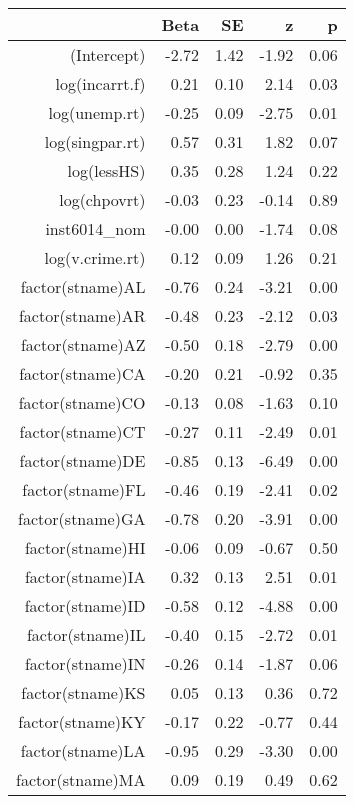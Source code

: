 \begin{table}[ht]
\centering
\begin{tabular}{rrrrr}
  \hline
 & Beta & SE & z & p \\ 
  \hline
(Intercept) & -2.72 & 1.42 & -1.92 & 0.06 \\ 
  log(incarrt.f) & 0.21 & 0.10 & 2.14 & 0.03 \\ 
  log(unemp.rt) & -0.25 & 0.09 & -2.75 & 0.01 \\ 
  log(singpar.rt) & 0.57 & 0.31 & 1.82 & 0.07 \\ 
  log(lessHS) & 0.35 & 0.28 & 1.24 & 0.22 \\ 
  log(chpovrt) & -0.03 & 0.23 & -0.14 & 0.89 \\ 
  inst6014\_nom & -0.00 & 0.00 & -1.74 & 0.08 \\ 
  log(v.crime.rt) & 0.12 & 0.09 & 1.26 & 0.21 \\ 
  factor(stname)AL & -0.76 & 0.24 & -3.21 & 0.00 \\ 
  factor(stname)AR & -0.48 & 0.23 & -2.12 & 0.03 \\ 
  factor(stname)AZ & -0.50 & 0.18 & -2.79 & 0.00 \\ 
  factor(stname)CA & -0.20 & 0.21 & -0.92 & 0.35 \\ 
  factor(stname)CO & -0.13 & 0.08 & -1.63 & 0.10 \\ 
  factor(stname)CT & -0.27 & 0.11 & -2.49 & 0.01 \\ 
  factor(stname)DE & -0.85 & 0.13 & -6.49 & 0.00 \\ 
  factor(stname)FL & -0.46 & 0.19 & -2.41 & 0.02 \\ 
  factor(stname)GA & -0.78 & 0.20 & -3.91 & 0.00 \\ 
  factor(stname)HI & -0.06 & 0.09 & -0.67 & 0.50 \\ 
  factor(stname)IA & 0.32 & 0.13 & 2.51 & 0.01 \\ 
  factor(stname)ID & -0.58 & 0.12 & -4.88 & 0.00 \\ 
  factor(stname)IL & -0.40 & 0.15 & -2.72 & 0.01 \\ 
  factor(stname)IN & -0.26 & 0.14 & -1.87 & 0.06 \\ 
  factor(stname)KS & 0.05 & 0.13 & 0.36 & 0.72 \\ 
  factor(stname)KY & -0.17 & 0.22 & -0.77 & 0.44 \\ 
  factor(stname)LA & -0.95 & 0.29 & -3.30 & 0.00 \\ 
  factor(stname)MA & 0.09 & 0.19 & 0.49 & 0.62 \\ 

\end{tabular}
\end{table}
